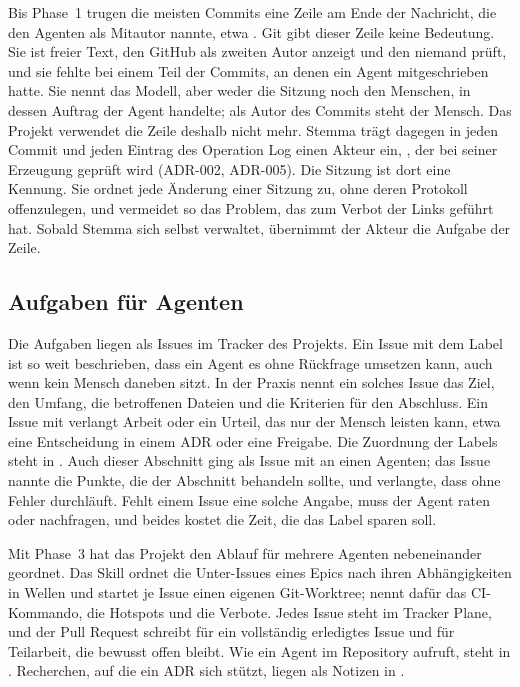 Bis Phase~1 trugen die meisten Commits eine Zeile am Ende der Nachricht,
die den Agenten als Mitautor nannte,
etwa .
Git gibt dieser Zeile keine Bedeutung.
Sie ist freier Text, den GitHub als zweiten Autor anzeigt und den niemand prüft,
und sie fehlte bei einem Teil der Commits, an denen ein Agent mitgeschrieben hatte.
Sie nennt das Modell, aber weder die Sitzung noch den Menschen,
in dessen Auftrag der Agent handelte; als Autor des Commits steht der Mensch.
Das Projekt verwendet die Zeile deshalb nicht mehr.
Stemma trägt dagegen in jeden Commit und jeden Eintrag des Operation Log einen Akteur ein,
,
der bei seiner Erzeugung geprüft wird (ADR-002, ADR-005).
Die Sitzung ist dort eine Kennung.
Sie ordnet jede Änderung einer Sitzung zu, ohne deren Protokoll offenzulegen,
und vermeidet so das Problem, das zum Verbot der Links geführt hat.
Sobald Stemma sich selbst verwaltet, übernimmt der Akteur die Aufgabe der Zeile.

\subsection{Aufgaben für Agenten}

Die Aufgaben liegen als Issues im Tracker des Projekts.
Ein Issue mit dem Label  ist so weit beschrieben,
dass ein Agent es ohne Rückfrage umsetzen kann, auch wenn kein Mensch daneben sitzt.
In der Praxis nennt ein solches Issue das Ziel, den Umfang,
die betroffenen Dateien und die Kriterien für den Abschluss.
Ein Issue mit  verlangt Arbeit oder ein Urteil,
das nur der Mensch leisten kann, etwa eine Entscheidung in einem ADR oder eine Freigabe.
Die Zuordnung der Labels steht in .
Auch dieser Abschnitt ging als Issue mit  an einen Agenten;
das Issue nannte die Punkte, die der Abschnitt behandeln sollte,
und verlangte, dass  ohne Fehler durchläuft.
Fehlt einem Issue eine solche Angabe, muss der Agent raten oder nachfragen,
und beides kostet die Zeit, die das Label sparen soll.

Mit Phase~3 hat das Projekt den Ablauf für mehrere Agenten nebeneinander geordnet.
Das Skill  ordnet die Unter-Issues eines Epics nach ihren Abhängigkeiten
in Wellen und startet je Issue einen eigenen Git-Worktree;
 nennt dafür das CI-Kommando, die Hotspots und die Verbote.
Jedes Issue steht im Tracker Plane, und der Pull Request schreibt  für ein
vollständig erledigtes Issue und  für Teilarbeit, die bewusst offen bleibt.
Wie ein Agent  im Repository aufruft, steht in .
Recherchen, auf die ein ADR sich stützt, liegen als Notizen in .

